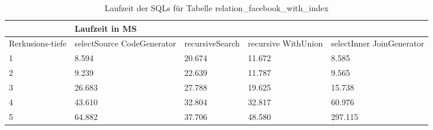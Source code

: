 \begin{table}[H]
	\centering
	\begin{tabular}{l|l|l|l|l|l|}
		\cline{2-6}
		& \multicolumn{5}{|l|}{Laufzeit in MS}                                                                                                                                                  \\ \hline
		\multicolumn{1}{|l|}{\multirow{2}{2cm}{Rerkusions-tiefe}} & \multicolumn{2}{|l|}{\multirow{2}{3cm}{selectSource CodeGenerator}} & \multirow{2}{2.8cm}{recursiveSearch} & \multirow{2}{2.5cm}{recursive WithUnion} & \multirow{2}{2.5cm}{selectInner JoinGenerator} \\
		\multicolumn{1}{|l|}{}
		& \multicolumn{2}{|l|}{}                                           &                                  &                                     &                                           \\ \hline
		
		\multicolumn{1}{|l|}{1}                                 & \multicolumn{2}{l|}{8.594}                                       & 20.674                                                & 11.672                                                    & 8.585                                                           \\ \hline
		\multicolumn{1}{|l|}{2}                                 & \multicolumn{2}{l|}{9.239}                                       & 22.639                                                & 11.787                                                    & 9.565                                                           \\ \hline
		\multicolumn{1}{|l|}{3}                                 & \multicolumn{2}{l|}{26.683}                                      & 27.788                                                & 19.625                                                    & 15.738                                                          \\ \hline
		\multicolumn{1}{|l|}{4}                                 & \multicolumn{2}{l|}{43.610}                                      & 32.804                                                & 32.817                                                    & 60.976                                                              \\ \hline
		\multicolumn{1}{|l|}{5}                                 & \multicolumn{2}{l|}{64.882}                                      & 37.706                                                & 48.580                                                    & 297.115                                                         \\ \hline
	\end{tabular}
	\caption{Laufzeit der SQLs für Tabelle relation\_facebook\_with\_index}
\end{table}

